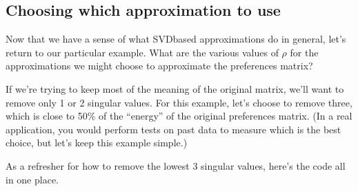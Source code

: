 \documentclass[letterpaper,10pt,english]{sphinxmanual}
\begin{document}
\subsection{Choosing which approximation to use}
\label{\detokenize{chapter-16-matrices:choosing-which-approximation-to-use}}
Now that we have a sense of what SVD\sphinxhyphen{}based approximations do in general, let’s return to our particular example.  What are the various values of \(\rho\) for the approximations we might choose to approximate the preferences matrix?

\begin{sphinxVerbatim}[commandchars=\\\{\}]
\PYG{p}{[}           \PYG{p}{]}
\end{sphinxVerbatim}

\begin{sphinxVerbatim}[commandchars=\\\{\}]
[1.0,
 2.7386486204421176e\PYGZhy{}09,
 0.32212667929693084,
 0.5422162727569352,
 0.6921213328320457,
 0.8460293400488615,
 1.0]
\end{sphinxVerbatim}

If we’re trying to keep most of the meaning of the original matrix, we’ll want to remove only 1 or 2 singular values.  For this example, let’s choose to remove three, which is close to 50\% of the “energy” of the original preferences matrix.  (In a real application, you would perform tests on past data to measure which is the best choice, but let’s keep this example simple.)

As a refresher for how to remove the lowest 3 singular values, here’s the code all in one place.

\begin{sphinxVerbatim}[commandchars=\\\{\}]
    
\PYG{p}{[}\PYG{p}{]}    

     
   

      
   
\end{sphinxVerbatim}
\end{document}
